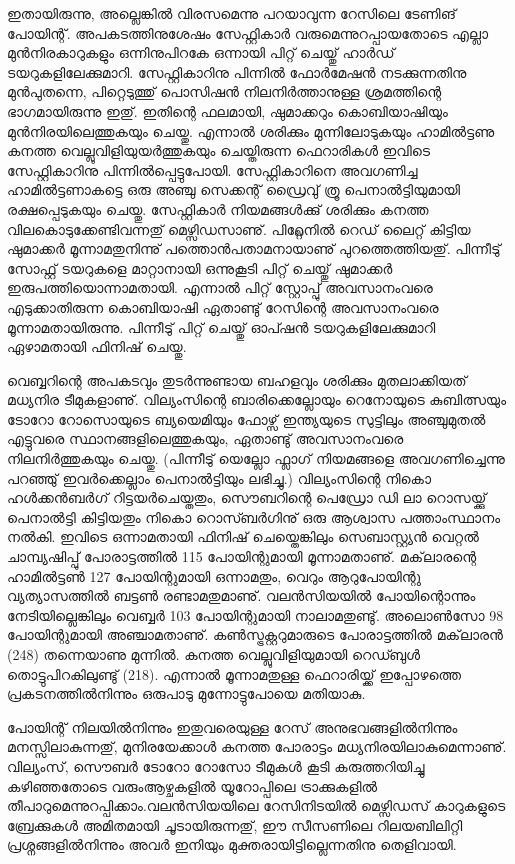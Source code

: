 ഇതായിരുന്നു, അല്ലെങ്കില്‍ വിരസമെന്നു പറയാവുന്ന റേസിലെ ടേണിങ് പോയിന്റ്. അപകടത്തിനുശേഷം സേഫ്റ്റികാര്‍ 
വരുമെന്നുറപ്പായതോടെ എല്ലാ മുന്‍നിരകാറുകളും ഒന്നിനുപിറകേ ഒന്നായി പിറ്റ് ചെയ്തു് ഹാര്‍ഡ് ടയറുകളിലേക്കുമാറി. 
സേഫ്റ്റികാറിനു പിന്നില്‍ ഫോര്‍മേഷന്‍ നടക്കുന്നതിനു മുന്‍പുതന്നെ, പിറ്റെടുത്തു് പൊസിഷന്‍ നിലനിര്‍ത്താനുള്ള 
ശ്രമത്തിന്റെ ഭാഗമായിരുന്നു ഇതു്. ഇതിന്റെ ഫലമായി, ഷുമാക്കറും കൊബിയാഷിയും മുന്‍നിരയിലെത്തുകയും ചെയ്തു. 
എന്നാല്‍ ശരിക്കും മുന്നിലോടുകയും ഹാമില്‍ട്ടണു കനത്ത വെല്ലുവിളിയുയര്‍ത്തുകയും ചെയ്തിരുന്ന ഫെറാരികള്‍ ഇവിടെ 
സേഫ്റ്റികാറിനു പിന്നില്‍പ്പെട്ടുപോയി. സേഫ്റ്റികാറിനെ അവഗണിച്ച ഹാമില്‍ട്ടണാകട്ടെ ഒരു അഞ്ചു സെക്കന്റ് ഡ്രൈവു് ത്രൂ 
പെനാല്‍ട്ടിയുമായി രക്ഷപ്പെടുകയും ചെയ്തു. സേഫ്റ്റികാര്‍ നിയമങ്ങള്‍ക്കു് ശരിക്കും കനത്ത വിലകൊടുക്കേണ്ടിവന്നതു് 
മെഴ്സിഡസാണു്. പിറ്റ്ലേനില്‍ റെഡ് ലൈറ്റ് കിട്ടിയ ഷുമാക്കര്‍ മൂന്നാമതുനിന്നു് പത്തൊന്‍പതാമനായാണു് പുറത്തെത്തിയതു്. 
പിന്നീടു് സോഫ്റ്റ് ടയറുകളെ മാറ്റാനായി ഒന്നുകൂടി പിറ്റ് ചെയ്തു് ഷുമാക്കര്‍ ഇരുപത്തിയൊന്നാമതായി. എന്നാല്‍ പിറ്റ് 
സ്റ്റോപ്പു് അവസാനംവരെ എടുക്കാതിരുന്ന കൊബിയാഷി ഏതാണ്ടു് റേസിന്റെ അവസാനംവരെ മൂന്നാമതായിരുന്നു. 
പിന്നീടു് പിറ്റ് ചെയ്തു് ഓപ്ഷന്‍ ടയറുകളിലേക്കുമാറി ഏഴാമതായി ഫിനിഷ് ചെയ്തു.

വെബ്ബറിന്റെ അപകടവും തുടര്‍ന്നുണ്ടായ ബഹളവും ശരിക്കും മുതലാക്കിയത് മധ്യനിര ടീമുകളാണു്. വില്യംസിന്റെ 
ബാരിക്കെല്ലോയും റെനോയുടെ കുബിത്സയും ടോറോ റോസൊയുടെ ബ്യയെമിയും ഫോഴ്സ് ഇന്ത്യയുടെ സുട്ടിലും 
അഞ്ചുമുതല്‍ എട്ടുവരെ സ്ഥാനങ്ങളിലെത്തുകയും, ഏതാണ്ടു് അവസാനംവരെ നിലനിര്‍ത്തുകയും ചെയ്തു. (പിന്നീടു് 
യെല്ലോ ഫ്ലാഗ് നിയമങ്ങളെ അവഗണിച്ചെന്നു പറഞ്ഞു് ഇവര്‍ക്കെല്ലാം പെനാല്‍ട്ടിയും ലഭിച്ചു.) വില്യംസിന്റെ നികൊ 
ഹള്‍ക്കന്‍ബര്‍ഗ് റിട്ടയര്‍ചെയ്തതും, സൌബറിന്റെ പെഡ്രോ ഡി ലാ റൊസയ്ക്കു് പെനാല്‍ട്ടി കിട്ടിയതും നികൊ 
റൊസ്ബര്‍ഗിനു് ഒരു ആശ്വാസ പത്താംസ്ഥാനം നല്‍കി. ഇവിടെ ഒന്നാമതായി ഫിനിഷ് ചെയ്തെങ്കിലും സെബാസ്റ്റ്യന്‍ 
വെറ്റല്‍ ചാമ്പ്യഷിപ്പു് പോരാട്ടത്തില്‍ 115 പോയിന്റുമായി മൂന്നാമതാണു്. മക്‌ലാരന്റെ ഹാമില്‍ട്ടണ്‍ 127 പോയിന്റുമായി 
ഒന്നാമതും, വെറും ആറുപോയിന്റു വ്യത്യാസത്തില്‍ ബട്ടണ്‍ രണ്ടാമതുമാണു്. വലന്‍സിയയില്‍ പോയിന്റൊന്നും 
നേടിയില്ലെങ്കിലും വെബ്ബര്‍ 103 പോയിന്റുമായി നാലാമതുണ്ടു്. അലൊണ്‍സോ 98 പോയിന്റുമായി അഞ്ചാമതാണു്. 
കണ്‍സ്ട്രക്റ്ററുമാരുടെ പോരാട്ടത്തില്‍ മക്‌ലാരന്‍ (248) തന്നെയാണു മുന്നില്‍. കനത്ത വെല്ലുവിളിയുമായി റെഡ്ബുള്‍ 
തൊട്ടുപിറകിലുണ്ടു് (218). എന്നാല്‍ മൂന്നാമതുള്ള ഫെറാരിയ്ക്ക് ഇപ്പോഴത്തെ പ്രകടനത്തില്‍നിന്നും 
ഒരുപാടു മുന്നോട്ടുപോയെ മതിയാകു.

പോയിന്റ് നിലയില്‍നിന്നും ഇതുവരെയുള്ള റേസ് അനുഭവങ്ങളില്‍നിന്നും മനസ്സിലാകുന്നതു്, മുനിരയേക്കാള്‍ കനത്ത 
പോരാട്ടം മധ്യനിരയിലാകുമെന്നാണു്. വില്യംസ്, സൌബര്‍ ടോറോ റോസോ ടീമുകള്‍ കൂടി കരുത്തറിയിച്ചു കഴിഞ്ഞതോടെ
വരുംആഴ്ചകളില്‍ യൂറോപ്പിലെ ട്രാക്കുകളില്‍ തീപാറുമെന്നുറപ്പിക്കാം.വലന്‍സിയയിലെ റേസിനിടയില്‍ മെഴ്സിഡസ് 
കാറുകളുടെ ബ്രേക്കുകള്‍ അമിതമായി ചൂടായിരുന്നതു്, ഈ സീസണിലെ റിലയബിലിറ്റി പ്രശ്നങ്ങളില്‍നിന്നും അവര്‍ ഇനിയും 
മുക്തരായിട്ടില്ലെന്നതിനു തെളിവായി.

